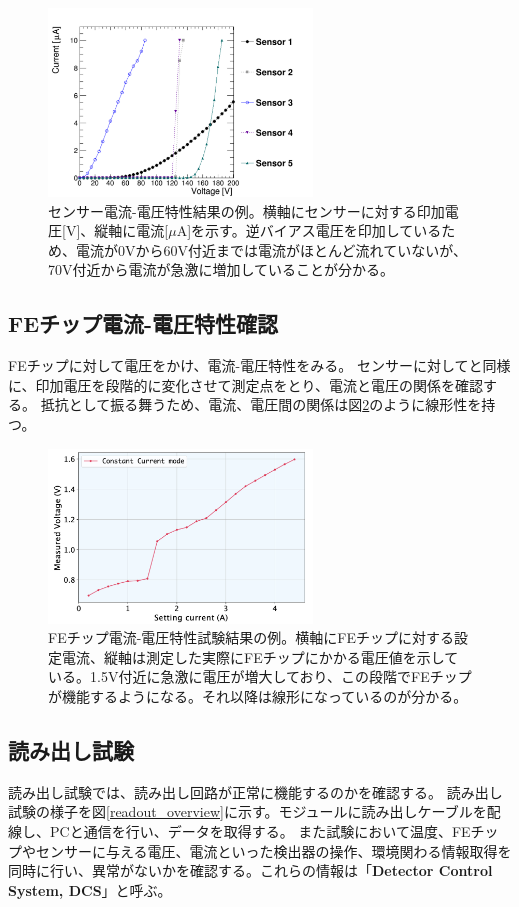 \begin{figure}[bpt]\centering
\includegraphics[width=7cm]{sensor_IV_result}
\caption[センサー電流-電圧特性結果の例]{センサー電流-電圧特性結果の例\cite{3-4}。横軸にセンサーに対する印加電圧[V]、縦軸に電流[$\mu$A]を示す。逆バイアス電圧を印加しているため、電流が0Vから60V付近までは電流がほとんど流れていないが、70V付近から電流が急激に増加していることが分かる。}
\label{sensor_IV_result}
\end{figure}

\subsection{FEチップ電流-電圧特性確認}
FEチップに対して電圧をかけ、電流-電圧特性をみる。
センサーに対してと同様に、印加電圧を段階的に変化させて測定点をとり、電流と電圧の関係を確認する。
抵抗として振る舞うため、電流、電圧間の関係は図\ref{SLDO_VI_result}のように線形性を持つ。

\begin{figure}[bpt]\centering
\includegraphics[width=7cm]{SLDO_VI_result}
\caption[FEチップ電流-電圧特性試験結果の例。]{FEチップ電流-電圧特性試験結果の例\cite{3-4}。横軸にFEチップに対する設定電流、縦軸は測定した実際にFEチップにかかる電圧値を示している。1.5V付近に急激に電圧が増大しており、この段階でFEチップが機能するようになる。それ以降は線形になっているのが分かる。}
\label{SLDO_VI_result}
\end{figure}

\clearpage
\subsection{読み出し試験}
読み出し試験では、読み出し回路が正常に機能するのかを確認する。
読み出し試験の様子を図\ref{readout_overview}に示す。モジュールに読み出しケーブルを配線し、PCと通信を行い、データを取得する。
また試験において温度、FEチップやセンサーに与える電圧、電流といった検出器の操作、環境関わる情報取得を同時に行い、異常がないかを確認する。これらの情報は「\textbf{Detector Control System, DCS}」と呼ぶ。


